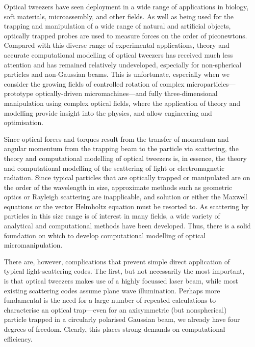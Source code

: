 \documentclass{article}
\begin{document}
Optical tweezers have seen deployment in a wide range of applications
in biology, soft materials, microassembly, and other fields.
As well as being used
for the trapping and manipulation of a wide range of natural and artificial
objects, optically trapped probes are used to measure forces on the order
of piconewtons. Compared with this diverse range of experimental applications,
theory and accurate computational modelling of optical tweezers has received
much less attention and has remained relatively undeveloped, especially for
non-spherical particles and non-Gaussian beams. This is unfortunate,
especially when we consider the growing
fields of controlled rotation of complex microparticles---prototype
optically-driven micromachines---and fully three-dimensional
manipulation using complex optical fields, where
the application of theory and modelling provide insight into the
physics, and allow engineering and optimisation.

Since optical forces and torques result
from the transfer of momentum and angular momentum from the trapping
beam to the particle via scattering, the theory and computational
modelling of optical tweezers is, in essence, the theory and computational
modelling of the scattering of light or electromagnetic radiation.
Since typical particles that are
optically trapped or manipulated are on the order of the
wavelength in size, approximate methods such as geometric
optics or Rayleigh scattering are inapplicable, and solution
or either the Maxwell equations or the vector Helmholtz equation
must be resorted to. As scattering by particles in this size
range is of interest in many fields, a wide variety of analytical
and computational methods have been developed. Thus, there is
a solid foundation on which to develop computational modelling
of optical micromanipulation.

There are, however, complications that prevent simple direct application of
typical light-scattering codes. The first, but not necessarily the
most important, is that optical tweezers
makes use of a highly focussed laser beam, while most existing scattering
codes assume plane wave illumination. Perhaps more fundamental is the
need for a large number of repeated calculations to characterise an
optical trap---even for an axisymmetric (but nonspherical) particle trapped
in a circularly polarised Gaussian beam, we already have four degrees
of freedom. Clearly, this places strong demands on computational
efficiency.
\end{document}
